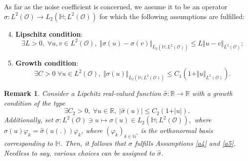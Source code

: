 \documentclass[10pt,number,preprint,times]{elsarticle}
\numberwithin{equation}{section} %
\newtheorem{rem}{Remark}[section]
\begin{document}
As far as the noise coefficient is concerned, we assume it to be an operator $\sigma : L^2(\mathcal{O}) \longrightarrow L_2(\mathbb{H};L^2(\mathcal{O}))$ for which the following assumptions are fulfilled: 
\begin{enumerate}[label={({A${{_\arabic*}}$})}]
	\setcounter{enumi}{3}
	\item \label{a4} \textbf{Lipschitz condition}: 
	$$\exists L>0,\; \forall u,v \in L^2(\mathcal{O}),\; \Vert \sigma(u)-\sigma(v) \Vert_{L_2(\mathbb{H};L^2(\mathcal{O}))} \leq L \Vert u-v \Vert_{L^2(\mathcal{O})};$$ 
	\item \label{a5} \textbf{Growth condition}:
	$$\exists C>0\; \forall u \in L^2(\mathcal{O}),\; \Vert \sigma(u) \Vert_{L_2(\mathbb{H};L^2(\mathcal{O}))} \leq C_1 \left(1+\Vert u\Vert_{L^2(\mathcal{O})}\right).$$
\end{enumerate}
\begin{rem}
Consider a Lipchitz real-valued function $\hat{\sigma} : \mathbb{R} \longrightarrow \mathbb{R}$ with a growth condition of the type 
$$
\exists C_2>0,\; \forall u \in \mathbb{R},\; \vert \hat{\sigma}(u) \vert \leq C_2 \left(1+\vert u \vert\right).$$
Additionally, set
$\sigma :  L^2(\mathcal{O}) \ni u \mapsto \sigma(u) \in L_2(\mathbb{H};L^2(\mathcal{O})),$ where $\sigma(u)\varphi_k=\hat{\sigma}(u(.)) \varphi_k$, where $\left(\varphi_k\right)_{k \in \mathbb{N}^*}$ is the orthonormal basis corresponding to $\mathbb{H}$. Then, it follows that $\sigma$ fulfills Assumptions \ref{a4} and \ref{a5}. Needless to say, various choices can be assigned to $\hat{\sigma}$. 
\end{rem}
\end{document}
